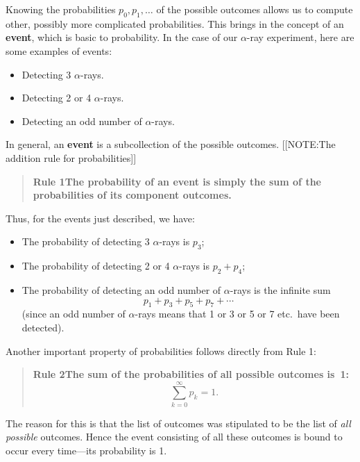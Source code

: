 Knowing the probabilities $p_0,p_1,\ldots$ of the possible outcomes
allows us to compute other, possibly more complicated probabilities.
This brings in the concept of an {\bf event}, which is basic to
probability.  In the case of our $\alpha$-ray experiment, here are
some examples of events:
\begin{itemize}

\item Detecting 3 $\alpha$-rays.

\item Detecting 2 or 4 $\alpha$-rays.

\item Detecting an odd number of $\alpha$-rays.
\end{itemize}
In general, an {\bf event} is a
subcollection of the possible outcomes.  
[[NOTE:The addition rule  for probabilities]]
\begin{quote}  

{\bf Rule 1\quad The {\bf probability of an event} is simply the sum of the probabilities of its component outcomes.}\label{rule1}
\end{quote}
Thus, for the events just described, we have:
\begin{itemize}

\item The probability of detecting 3 $\alpha$-rays is $p_3$;

\item The probability of detecting 2 or 4 $\alpha$-rays is $p_2+p_4$;

\item The probability of detecting an odd number of $\alpha$-rays is
  the infinite sum
\[
p_1+p_3+p_5+p_7+\cdots 
\]
(since an odd number of $\alpha$-rays means that 1 or 3 or 5 or 7
etc.\ have been detected).
\end{itemize}

Another important property of probabilities follows directly from Rule 1:
\begin{quote}

{\bf Rule 2\quad The sum of the probabilities of all possible outcomes is~1:
\[
 \sum_{k=0}^\infty p_k=1.
\]
}
\end{quote}
The reason for this is that the list of outcomes was stipulated to be
the list of {\em all possible} outcomes. Hence the event consisting of
all these outcomes is bound to occur every time---its probability is
1.


